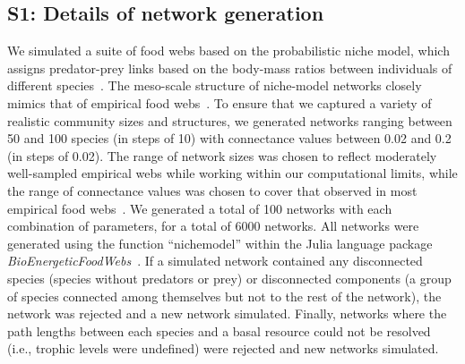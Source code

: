 \documentclass[12pt]{article}
\begin{document}
\clearpage
\begin{spacing}{2.0}
\linenumbers
\section*{S1: Details of network generation}

	We simulated a suite of food webs based on the probabilistic niche model, which assigns predator-prey links based on the body-mass ratios between individuals of different species~\citep{Williams2000,Delmas2017}. The meso-scale structure of niche-model networks closely mimics that of empirical food webs~\citep{Stouffer2007}. To ensure that we captured a variety of realistic community sizes and structures, we generated networks ranging between 50 and 100 species (in steps of 10) with connectance values between 0.02 and 0.2 (in steps of 0.02). The range of network sizes was chosen to reflect moderately well-sampled empirical webs while working within our computational limits, while the range of connectance values was chosen to cover that observed in most empirical food webs~\citep{Dunne2002e}. We generated a total of 100 networks with each combination of parameters, for a total of 6000 networks. All networks were generated using the function ``nichemodel'' within the Julia language package \emph{BioEnergeticFoodWebs}~\citep{bioenergeticfw,Delmas2017}. If a simulated network contained any disconnected species (species without predators or prey) or disconnected components (a group of species connected among themselves but not to the rest of the network), the network was rejected and a new network simulated. Finally, networks where the path lengths between each species and a basal resource could not be resolved (i.e., trophic levels were undefined) were rejected and new networks simulated.



\end{spacing}
\end{document}
